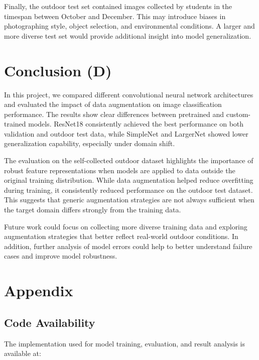 \documentclass[a4paper]{article}
\begin{document}
Finally, the outdoor test set contained images collected by students in the timespan between October and December. This may introduce biases in photographing style, object selection, and environmental conditions. A larger and more diverse test set would provide additional insight into model generalization.

\section{Conclusion (D)}
In this project, we compared different convolutional neural network architectures and evaluated the impact of data augmentation on image classification performance. The results show clear differences between pretrained and custom-trained models. ResNet18 consistently achieved the best performance on both validation and outdoor test data, while SimpleNet and LargerNet showed lower generalization capability, especially under domain shift.

The evaluation on the self-collected outdoor dataset highlights the importance of robust feature representations when models are applied to data outside the original training distribution. While data augmentation helped reduce overfitting during training, it consistently reduced performance on the outdoor test dataset. This suggests that generic augmentation strategies are not always sufficient when the target domain differs strongly from the training data.

Future work could focus on collecting more diverse training data and exploring augmentation strategies that better reflect real-world outdoor conditions. In addition, further analysis of model errors could help to better understand failure cases and improve model robustness.




\newpage




\newpage

\appendix
\section{Appendix}

\subsection{Code Availability}
The implementation used for model training, evaluation, and result analysis is available at:
\end{document}
